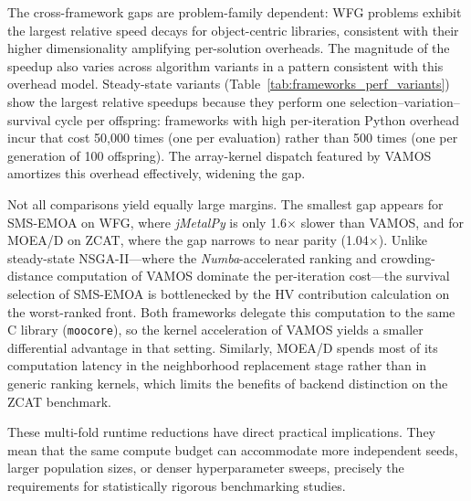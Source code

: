 \documentclass[final,5p,times,twocolumn]{elsarticle}
\newcommand{\VAMOS}{VAMOS}
\begin{document}
The cross-framework gaps are problem-family dependent: WFG problems exhibit the largest relative speed decays for object-centric libraries, consistent with their higher dimensionality amplifying per-solution overheads. The magnitude of the speedup also varies across algorithm variants in a pattern consistent with this overhead model. Steady-state variants (Table~\ref{tab:frameworks_perf_variants}) show the largest relative speedups because they perform one selection--variation--survival cycle per offspring: frameworks with high per-iteration Python overhead incur that cost 50{,}000 times (one per evaluation) rather than 500 times (one per generation of 100 offspring). The array-kernel dispatch featured by VAMOS amortizes this overhead effectively, widening the gap.

Not all comparisons yield equally large margins. The smallest gap appears for SMS-EMOA on WFG, where \textit{jMetalPy} is only 1.6$\times$ slower than \VAMOS{}, and for MOEA/D on ZCAT, where the gap narrows to near parity (1.04$\times$). Unlike steady-state NSGA-II---where the \textit{Numba}-accelerated ranking and crowding-distance computation of \VAMOS{} dominate the per-iteration cost---the survival selection of SMS-EMOA is bottlenecked by the HV contribution calculation on the worst-ranked front. Both frameworks delegate this computation to the same C library (\texttt{moocore}), so the kernel acceleration of \VAMOS{} yields a smaller differential advantage in that setting. Similarly, MOEA/D spends most of its computation latency in the neighborhood replacement stage rather than in generic ranking kernels, which limits the benefits of backend distinction on the ZCAT benchmark.

These multi-fold runtime reductions have direct practical implications. They mean that the same compute budget can accommodate more independent seeds, larger population sizes, or denser hyperparameter sweeps, precisely the requirements for statistically rigorous benchmarking studies.


\end{document}
